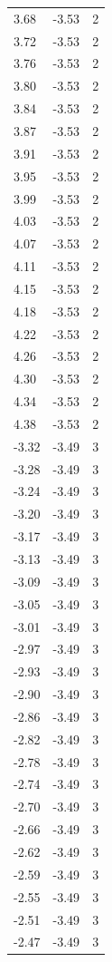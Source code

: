 \begin{longtable}{lrr}
  3.68 & -3.53 & 2 \\
  3.72 & -3.53 & 2 \\
  3.76 & -3.53 & 2 \\
  3.80 & -3.53 & 2 \\
  3.84 & -3.53 & 2 \\
  3.87 & -3.53 & 2 \\
  3.91 & -3.53 & 2 \\
  3.95 & -3.53 & 2 \\
  3.99 & -3.53 & 2 \\
  4.03 & -3.53 & 2 \\
  4.07 & -3.53 & 2 \\
  4.11 & -3.53 & 2 \\
  4.15 & -3.53 & 2 \\
  4.18 & -3.53 & 2 \\
  4.22 & -3.53 & 2 \\
  4.26 & -3.53 & 2 \\
  4.30 & -3.53 & 2 \\
  4.34 & -3.53 & 2 \\
  4.38 & -3.53 & 2 \\
  -3.32 & -3.49 & 3 \\
  -3.28 & -3.49 & 3 \\
  -3.24 & -3.49 & 3 \\
  -3.20 & -3.49 & 3 \\
  -3.17 & -3.49 & 3 \\
  -3.13 & -3.49 & 3 \\
  -3.09 & -3.49 & 3 \\
  -3.05 & -3.49 & 3 \\
  -3.01 & -3.49 & 3 \\
  -2.97 & -3.49 & 3 \\
  -2.93 & -3.49 & 3 \\
  -2.90 & -3.49 & 3 \\
  -2.86 & -3.49 & 3 \\
  -2.82 & -3.49 & 3 \\
  -2.78 & -3.49 & 3 \\
  -2.74 & -3.49 & 3 \\
  -2.70 & -3.49 & 3 \\
  -2.66 & -3.49 & 3 \\
  -2.62 & -3.49 & 3 \\
  -2.59 & -3.49 & 3 \\
  -2.55 & -3.49 & 3 \\
  -2.51 & -3.49 & 3 \\
  -2.47 & -3.49 & 3 \\

\end{longtable}
